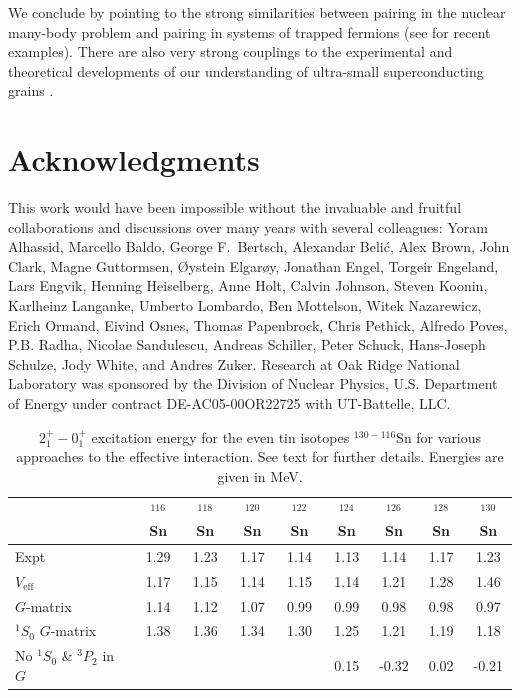 \documentclass[rmp,aps,floatfix]{revtex4}
\begin{document}
We conclude by pointing to the strong similarities between pairing in 
the nuclear 
many-body problem and pairing in systems of trapped fermions (see
\cite{henning_ben,bruun2000} for recent examples). 
There are also very strong couplings
to the experimental and theoretical developments of our understanding of
ultra-small superconducting grains 
\cite{tinkham95,tinkham96,tinkham98,delft2000,balian1999,mastellone98,sierra99}.


\section*{Acknowledgments}
This work would have been impossible without the 
invaluable and fruitful
collaborations and discussions over many years with several colleagues: 
Yoram Alhassid, Marcello Baldo, George F.~Bertsch, Alexandar
Beli\'c, Alex Brown, John Clark, 
Magne Guttormsen, \O ystein Elgar\o y, Jonathan Engel, Torgeir Engeland, 
Lars Engvik, Henning Heiselberg, 
Anne Holt, Calvin Johnson, Steven Koonin, 
Karlheinz Langanke, Umberto Lombardo, Ben Mottelson, Witek Nazarewicz, 
Erich Ormand, 
Eivind Osnes, Thomas Papenbrock, Chris Pethick, 
Alfredo Poves, P.B. Radha, Nicolae Sandulescu, Andreas Schiller, 
Peter Schuck, Hans-Joseph Schulze, Jody White, and Andres Zuker.
Research at Oak Ridge National Laboratory was sponsored by the Division
of Nuclear Physics, U.S. Department of Energy under contract DE-AC05-00OR22725 
with UT-Battelle, LLC. 




\newpage


\begin{table}[hbt]
\begin{center}
\caption{ $2^+_1-0^+_1$ excitation energy for the 
even tin isotopes $^{130-116}$Sn for various approaches
to the effective interaction. See text for further details. 
Energies are given in MeV. \label{tab:table_tincalc1}}
\begin{tabular}{lcccccccc}\hline
 & {$^{116}$Sn} & {$^{118}$Sn} & {$^{120}$Sn} &{$^{122}$Sn} & {$^{124}$Sn} & {$^{126}$Sn} & {$^{128}$Sn} & {$^{130}$Sn} \\ \hline
Expt & 1.29 & 1.23 & 1.17 & 1.14 & 1.13 & 1.14 & 1.17 & 1.23 \\
$V_{\mathrm{eff}}$ & 1.17 & 1.15 & 1.14 & 1.15 & 1.14 & 1.21 & 1.28 & 1.46 \\
$G$-matrix &1.14 & 1.12& 1.07 & 0.99 & 0.99 & 0.98 & 0.98 & 0.97  \\
$^1S_0$ $G$-matrix &1.38 &1.36 &1.34 &1.30 & 1.25& 1.21 &1.19 &1.18 \\
No $^1S_0$ \& $^3P_2$ in $G$ &     &     &     &      &0.15 &-0.32 &0.02 &-0.21  \\\hline
\end{tabular}
\end{center}
\end{table}
\end{document}
